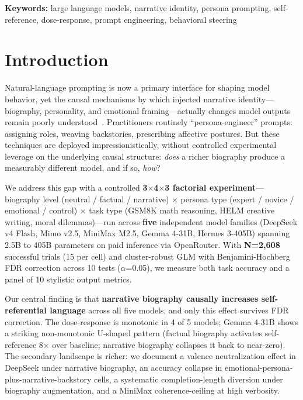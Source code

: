 \documentclass[11pt,a4paper]{article}
\begin{document}
\noindent\textbf{Keywords:} large language models, narrative identity, persona prompting, self-reference, dose-response, prompt engineering, behavioral steering

\newpage
\tableofcontents
\newpage

\section{Introduction}
\label{sec:intro}

Natural-language prompting is now a primary interface for shaping model behavior, yet the causal mechanisms by which injected narrative identity---biography, personality, and emotional framing---actually changes model outputs remain poorly understood~\citep{shanahan2024}. Practitioners routinely ``persona-engineer'' prompts: assigning roles, weaving backstories, prescribing affective postures. But these techniques are deployed impressionistically, without controlled experimental leverage on the underlying causal structure: \textit{does} a richer biography produce a measurably different model, and if so, \textit{how}?

We address this gap with a controlled \textbf{3$\times$4$\times$3 factorial experiment}---biography level (neutral / factual / narrative) $\times$ persona type (expert / novice / emotional / control) $\times$ task type (GSM8K math reasoning, HELM creative writing, moral dilemmas)---run across \textbf{five} independent model families (DeepSeek v4 Flash, Mimo v2.5, MiniMax M2.5, Gemma 4-31B, Hermes 3-405B) spanning 2.5B to 405B parameters on paid inference via OpenRouter. With \textbf{N=2,608} successful trials (15 per cell) and cluster-robust GLM with Benjamini-Hochberg FDR correction across 10 tests ($\alpha$=0.05), we measure both task accuracy and a panel of 10 stylistic output metrics.

Our central finding is that \textbf{narrative biography causally increases self-referential language} across all five models, and only this effect survives FDR correction. The dose-response is monotonic in 4 of 5 models; Gemma 4-31B shows a striking non-monotonic U-shaped pattern (factual biography activates self-reference 8$\times$ over baseline; narrative biography collapses it back to near-zero). The secondary landscape is richer: we document a valence neutralization effect in DeepSeek under narrative biography, an accuracy collapse in emotional-persona-plus-narrative-backstory cells, a systematic completion-length diversion under biography augmentation, and a MiniMax coherence-ceiling at high verbosity.
\end{document}
